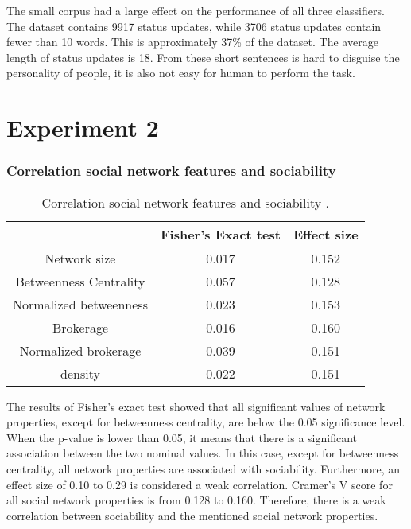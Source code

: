 \documentclass[
10pt, %
a4paper, %
oneside, %
headinclude,footinclude, %
] {book}%
\begin{document}
The small corpus had a large effect on the performance of all three classifiers. The dataset contains 9917 status updates, while 3706 status updates contain fewer than 10 words. This is approximately 37\% of the dataset. The average length of status updates is 18. From these short sentences is hard to disguise the personality of people, it is also not easy for human to perform the task.


\section{Experiment 2}
\subsubsection{Correlation social network features and sociability}
\begin{table}[hbtp]\centering
\caption{Correlation social network features and sociability .\label{table:lingall}}
\begin{tabular}{|ccc|}
\hline
 & Fisher's Exact test & Effect size\\
\hline
Network size & 0.017 & 0.152\\
Betweenness Centrality & 0.057 & 0.128\\
Normalized betweenness & 0.023 & 0.153\\
Brokerage & 0.016 & 0.160\\
Normalized brokerage & 0.039 & 0.151\\
density & 0.022 & 0.151\\
\hline
\end{tabular}
\end{table}
The results of Fisher’s exact test showed that all significant values of network properties, except for betweenness centrality, are below the 0.05 significance level. When the p-value is lower than 0.05, it means that there is a significant association between the two nominal values. In this case, except for betweenness centrality, all network properties are associated with sociability. Furthermore, an effect size of 0.10 to 0.29 is considered a weak correlation. Cramer's V score for all social network properties is from 0.128 to 0.160. Therefore, there is a weak correlation between sociability and the mentioned social network properties.
\end{document}
